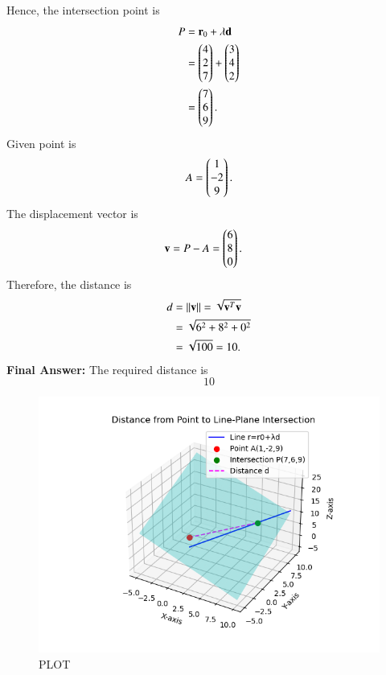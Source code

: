 \documentclass[journal]{IEEEtran}
\begin{document}
Hence, the intersection point is
\begin{align}
    P &= \mathbf{r}_0 + \lambda \mathbf{d} \\
      &= \begin{pmatrix}4 \\ 2 \\ 7\end{pmatrix} + \begin{pmatrix}3 \\ 4 \\ 2\end{pmatrix} \\
      &= \begin{pmatrix}7 \\ 6 \\ 9\end{pmatrix}.
\end{align}
Given point is
\begin{align}
    A = \begin{pmatrix}1 \\ -2 \\ 9\end{pmatrix}.
\end{align}
The displacement vector is
\begin{align}
    \mathbf{v} &= P - A = \begin{pmatrix}6 \\ 8 \\ 0\end{pmatrix}.
\end{align}
Therefore, the distance is
\begin{align}
    d &= \left\lVert\mathbf{v}\right\rVert = \sqrt{\mathbf{v}^T\mathbf{v}} \\
      &= \sqrt{6^2 + 8^2 + 0^2} \\
      &= \sqrt{100} = 10.
\end{align}
\textbf{Final Answer: } The required distance is 
\[
\boxed{10}
\]
\pagebreak
\begin{figure}[H]
    \centering
    \includegraphics[width=0.7\columnwidth]{figs/Figure_1.png}
    \caption{PLOT}
    \label{fig:fig1}
\end{figure}
\end{document}
